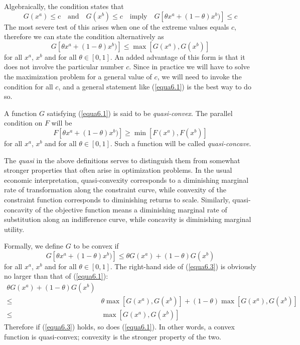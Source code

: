 Algebraically, the condition states that
\begin{equation*}
G(x^a) \leq c \quad \mbox{and} \quad G(x^b) \leq c \quad \mbox{imply} \quad  G[\theta x^a + (1-\theta) x^b)  ] \leq c  
\end{equation*}
The most severe test of this arises when one of the extreme values equals $c$, therefore we can state the condition alternatively as 
\begin{equation} \label{equa6.1}
 G[\theta x^a + (1-\theta) x^b)  ] \leq \max [G(x^a), G(x^b)]
\end{equation}
for all $x^a$, $x^b$ and for all $\theta \in [0,1]$. An added advantage of this form is that it does not involve the particular number $c$. Since in practice we will have to solve the maximization problem for a general value of $c$, we will need to invoke the condition for all $c$, and a general statement like (\ref{equa6.1}) is the best way to do so.

A function $G$ satisfying (\ref{equa6.1}) is said to be \textit{quasi-convex}. The parallel condition on $F$ will be 
\begin{equation} \label{equa6.2}
 F[\theta x^a + (1-\theta) x^b)  ] \geq \min [F(x^a), F(x^b)]
\end{equation}
for all $x^a$, $x^b$ and for all $\theta \in [0,1]$. Such a function will be called \textit{quasi-concave}.

The \textit{quasi} in the above definitions serves to distinguish them from somewhat stronger properties that often arise in optimization problems. In the usual economic interpretation, quasi-convexity corresponds to a diminishing marginal rate of transformation along the constraint curve, while convexity of the constraint function corresponds to diminishing returns to scale. Similarly, quasi-concavity of the objective function means a diminishing marginal rate of substitution along an indifference curve, while concavity is diminishing marginal utility.

Formally, we define $G$ to be convex if 
\begin{equation} \label{equa6.3}
 G[\theta x^a + (1-\theta) x^b)  ] \leq \theta G(x^a) + (1-\theta) G(x^b)  
\end{equation}
for all $x^a$, $x^b$ and for all $\theta \in [0,1]$. The right-hand side of (\ref{equa6.3}) is obviously no larger than that of (\ref{equa6.1}):
\begin{equation*}  
\begin{array}{rl}
 \theta G(x^a) + (1-\theta) G(x^b) \\ 
\leq &  \theta \max [G(x^a), G(x^b)] + (1-\theta) \max [G(x^a), G(x^b)] \\
\leq & \max [G(x^a), G(x^b)]
\end{array}
\end{equation*}
Therefore if (\ref{equa6.3}) holds, so does (\ref{equa6.1}). In other words, a convex function is quasi-convex; convexity is the stronger property of the two.

